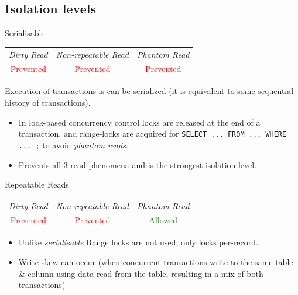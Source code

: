 \subsection{Isolation levels}
\begin{definitionbox}{Serialisable}
    \begin{center}
        \begin{tabular}{c | c | c}
            \textit{Dirty Read} & \textit{Non-repeatable Read} & \textit{{Phantom Read}} \\
            \textcolor{red}{Prevented} & \textcolor{red}{Prevented} & \textcolor{red}{Prevented} \\
        \end{tabular}
    \end{center}
    Execution of transactions is can be serialized (it is equivalent to some sequential history of transactions).
    \begin{itemize}
        \item In lock-based concurrency control locks are released at the end of a transaction, and range-locks are acquired for \texttt{SELECT ... FROM ... WHERE ... ;} to avoid \textit{phantom reads}. 
        \item Prevents all 3 read phenomena and is the strongest isolation level.
    \end{itemize}
\end{definitionbox}
\begin{definitionbox}{Repeatable Reads}
    \begin{center}
        \begin{tabular}{c | c | c}
            \textit{Dirty Read} & \textit{Non-repeatable Read} & \textit{{Phantom Read}} \\
            \textcolor{red}{Prevented} & \textcolor{red}{Prevented} & \textcolor{ForestGreen}{Allowed} \\
        \end{tabular}
    \end{center}
    \begin{itemize}
        \item Unlike \textit{serialisable} Range locks are not used, only locks per-record.
        \item Write skew can occur (when concurrent transactions write to the same table \& column using data read from the table, resulting in a mix of both transactions)
    \end{itemize}
\end{definitionbox}

